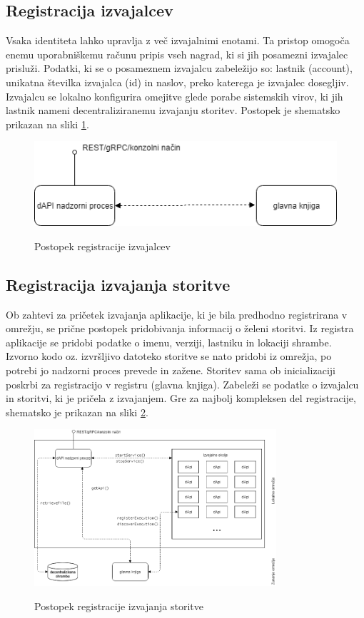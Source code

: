 \documentclass[a4paper, 12pt]{book}
\begin{document}
\subsection{Registracija izvajalcev}
\label{registerWorker}
Vsaka identiteta lahko upravlja z več izvajalnimi enotami.
Ta pristop omogoča enemu uporabniškemu računu pripis vseh nagrad, ki si jih posamezni izvajalec prisluži.
Podatki, ki se o posameznem izvajalcu zabeležijo so: lastnik (account), unikatna številka izvajalca (id) in naslov, preko katerega je izvajalec dosegljiv.
Izvajalcu se lokalno konfigurira omejitve glede porabe sistemskih virov, ki jih lastnik nameni decentraliziranemu izvajanju storitev.
Postopek je shematsko prikazan na sliki \ref{register_worker}.

\begin{figure}[h]
	\centering
	\includegraphics[width=1.0\textwidth]{slike/register_worker.png}
	\label{register_worker}
	\caption{Postopek registracije izvajalcev}
\end{figure}

\subsection{Registracija izvajanja storitve}
\label{registerExecution}
Ob zahtevi za pričetek izvajanja aplikacije, ki je bila predhodno registrirana v omrežju, se prične postopek pridobivanja informacij o želeni storitvi.
Iz registra aplikacije se pridobi podatke o imenu, verziji, lastniku in lokaciji shrambe.
Izvorno kodo oz. izvršljivo datoteko storitve se nato pridobi iz omrežja, po potrebi jo nadzorni proces prevede in zažene.
Storitev sama ob inicializaciji poskrbi za registracijo v registru (glavna knjiga).
Zabeleži se podatke o izvajalcu in storitvi, ki je pričela z izvajanjem.
Gre za najbolj kompleksen del registracije, shematsko je prikazan na sliki \ref{register_service}.

\begin{figure}[h]
	\centering
	\includegraphics[width=0.8\textwidth]{slike/register_service.png}
	\label{register_service}
	\caption{Postopek registracije izvajanja storitve}
\end{figure}
\end{document}
